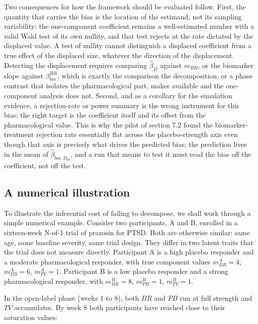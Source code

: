 \documentclass[
  11pt,
]{article}
\begin{document}
Two consequences for how the framework should be evaluated follow. First, the
quantity that carries the bias is the location of the estimand, not its
sampling variability: the one-component coefficient remains a well-estimated
number with a valid Wald test of its own nullity, and that test rejects at the
rate dictated by the displaced value. A test of nullity cannot distinguish a
displaced coefficient from a true effect of the displaced size, whatever
the direction of the displacement. Detecting the displacement requires
comparing \(\hat\beta_D\) against \(m_{BR}\), or the biomarker slope against
\(\beta_{bm}^{BR}\), which is exactly the comparison the decomposition, or a
phase contrast that isolates the pharmacological part, makes available and
the one-component analysis does not. Second, and as a corollary for the
simulation evidence, a rejection-rate or power summary is the wrong instrument
for this bias: the right target is the coefficient itself and its offset from
the pharmacological value. This is why the pilot of section 7.2 found the
biomarker-treatment rejection rate essentially flat across the placebo-strength
axis even though that axis is precisely what drives the predicted bias; the
prediction lives in the mean of \(\hat\beta_{bm:D_{bc}}\), and a run that
means to test it must read the bias off the coefficient, not off the test.

\subsection{A numerical illustration}\label{a-numerical-illustration}

To illustrate the inferential cost of failing to decompose, we shall work
through a simple numerical example. Consider two participants, A and B,
enrolled in a sixteen-week N-of-1 trial of prazosin for PTSD. Both are
otherwise similar: same age, same baseline severity, same trial design. They
differ in two latent traits that the trial does not measure directly.
Participant A is a high placebo responder and a moderate pharmacological
responder, with true component values \(m_{BR}^A = 4\), \(m_{PB}^A = 6\),
\(m_{TV}^A = 1\). Participant B is a low placebo responder and a strong
pharmacological responder, with \(m_{BR}^B = 8\), \(m_{PB}^B = 1\), \(m_{TV}^B =
1\).

In the open-label phase (weeks 1 to 8), both \(BR\) and \(PB\) run at full
strength and \(TV\) accumulates. By week 8 both participants have reached close
to their saturation values:
\end{document}
